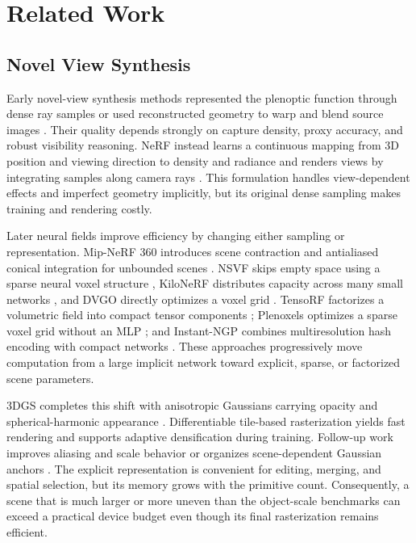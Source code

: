 \documentclass[conference]{IEEEtran}
\begin{document}
\section{Related Work}

\subsection{Novel View Synthesis}

Early novel-view synthesis methods represented the plenoptic function through dense ray samples or used reconstructed geometry to warp and blend source images \cite{levoy1996light,gortler1996lumigraph}. Their quality depends strongly on capture density, proxy accuracy, and robust visibility reasoning. NeRF instead learns a continuous mapping from 3D position and viewing direction to density and radiance and renders views by integrating samples along camera rays \cite{mildenhall2020nerf}. This formulation handles view-dependent effects and imperfect geometry implicitly, but its original dense sampling makes training and rendering costly.

Later neural fields improve efficiency by changing either sampling or representation. Mip-NeRF 360 introduces scene contraction and antialiased conical integration for unbounded scenes \cite{barron2022mipnerf360}. NSVF skips empty space using a sparse neural voxel structure \cite{liu2020nsvf}, KiloNeRF distributes capacity across many small networks \cite{reiser2021kilonerf}, and DVGO directly optimizes a voxel grid \cite{sun2022dvgo}. TensoRF factorizes a volumetric field into compact tensor components \cite{chen2022tensorf}; Plenoxels optimizes a sparse voxel grid without an MLP \cite{fridovichkeil2022plenoxels}; and Instant-NGP combines multiresolution hash encoding with compact networks \cite{muller2022instantngp}. These approaches progressively move computation from a large implicit network toward explicit, sparse, or factorized scene parameters.

3DGS completes this shift with anisotropic Gaussians carrying opacity and spherical-harmonic appearance \cite{kerbl2023gaussiansplatting}. Differentiable tile-based rasterization yields fast rendering and supports adaptive densification during training. Follow-up work improves aliasing and scale behavior \cite{yu2024mipsplatting} or organizes scene-dependent Gaussian anchors \cite{lu2024scaffoldgs}. The explicit representation is convenient for editing, merging, and spatial selection, but its memory grows with the primitive count. Consequently, a scene that is much larger or more uneven than the object-scale benchmarks can exceed a practical device budget even though its final rasterization remains efficient.
\end{document}
